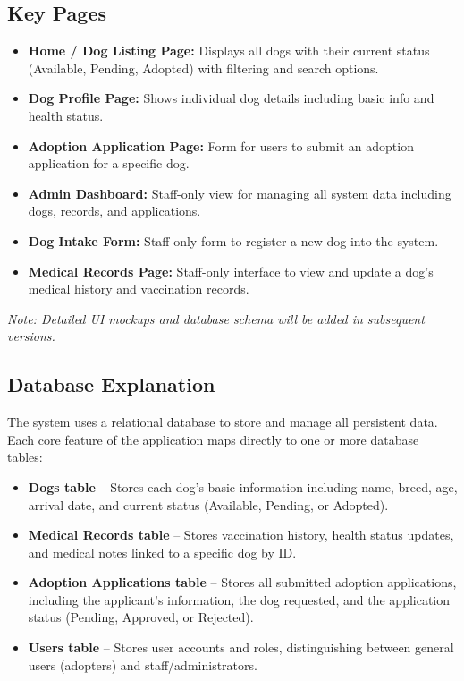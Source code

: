 \documentclass[12pt]{article}
\begin{document}
\subsection{Key Pages}
\begin{itemize}
    \item \textbf{Home / Dog Listing Page:} Displays all dogs with their current status
    (Available, Pending, Adopted) with filtering and search options.
    \item \textbf{Dog Profile Page:} Shows individual dog details including basic info
    and health status.
    \item \textbf{Adoption Application Page:} Form for users to submit an adoption
    application for a specific dog.
    \item \textbf{Admin Dashboard:} Staff-only view for managing all system data including
    dogs, records, and applications.
    \item \textbf{Dog Intake Form:} Staff-only form to register a new dog into the system.
    \item \textbf{Medical Records Page:} Staff-only interface to view and update a dog's
    medical history and vaccination records.
\end{itemize}
 
\textit{Note: Detailed UI mockups and database schema will be added in subsequent versions.}
 
\subsection{Database Explanation}
The system uses a relational database to store and manage all persistent data. Each core
feature of the application maps directly to one or more database tables:
 
\begin{itemize}
    \item \textbf{Dogs table} -- Stores each dog's basic information including name, breed,
    age, arrival date, and current status (Available, Pending, or Adopted).
    \item \textbf{Medical Records table} -- Stores vaccination history, health status updates,
    and medical notes linked to a specific dog by ID.
    \item \textbf{Adoption Applications table} -- Stores all submitted adoption applications,
    including the applicant's information, the dog requested, and the application status
    (Pending, Approved, or Rejected).
    \item \textbf{Users table} -- Stores user accounts and roles, distinguishing between
    general users (adopters) and staff/administrators.
\end{itemize}
 
\end{document}

